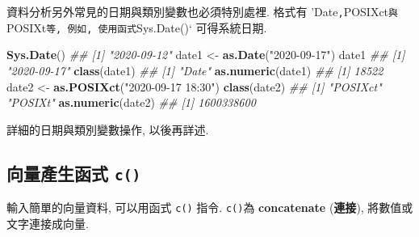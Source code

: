 \documentclass[
]{book}
\newenvironment{Shaded}{\begin{snugshade}}{\end{snugshade}}
\newcommand{\CommentTok}[1]{\textcolor[rgb]{0.56,0.35,0.01}{\textit{#1}}}
\newcommand{\KeywordTok}[1]{\textcolor[rgb]{0.13,0.29,0.53}{\textbf{#1}}}
\newcommand{\NormalTok}[1]{#1}
\newcommand{\StringTok}[1]{\textcolor[rgb]{0.31,0.60,0.02}{#1}}
\begin{document}
資料分析另外常見的日期與類別變數也必須特別處裡.
格式有 'Date\texttt{,}POSIXct\texttt{與}POSIXt\texttt{等,\ 例如,\ 使用函式}Sys.Date()` 可得系統日期.

\begin{Shaded}
\begin{Highlighting}[]
\KeywordTok{Sys.Date}\NormalTok{()}
\CommentTok{\#\# [1] "2020{-}09{-}12"}
\NormalTok{date1 \textless{}{-}}\StringTok{ }\KeywordTok{as.Date}\NormalTok{(}\StringTok{"2020{-}09{-}17"}\NormalTok{)}
\NormalTok{date1}
\CommentTok{\#\# [1] "2020{-}09{-}17"}
\KeywordTok{class}\NormalTok{(date1)}
\CommentTok{\#\# [1] "Date"}
\KeywordTok{as.numeric}\NormalTok{(date1)}
\CommentTok{\#\# [1] 18522}
\NormalTok{date2 \textless{}{-}}\StringTok{ }\KeywordTok{as.POSIXct}\NormalTok{(}\StringTok{"2020{-}09{-}17 18:30"}\NormalTok{)}
\KeywordTok{class}\NormalTok{(date2)}
\CommentTok{\#\# [1] "POSIXct" "POSIXt"}
\KeywordTok{as.numeric}\NormalTok{(date2)}
\CommentTok{\#\# [1] 1600338600}
\end{Highlighting}
\end{Shaded}

詳細的日期與類別變數操作, 以後再詳述.

\hypertarget{ux5411ux91cfux7522ux751fux51fdux5f0f-c}{%
\subsection{\texorpdfstring{向量產生函式 \texttt{c()}}{向量產生函式 c()}}\label{ux5411ux91cfux7522ux751fux51fdux5f0f-c}}

輸入簡單的向量資料, 可以用函式
\texttt{c()}
指令.
\texttt{c()}為 \textbf{concatenate} (\textbf{連接}),
將數值或文字連接成向量.
\end{document}
